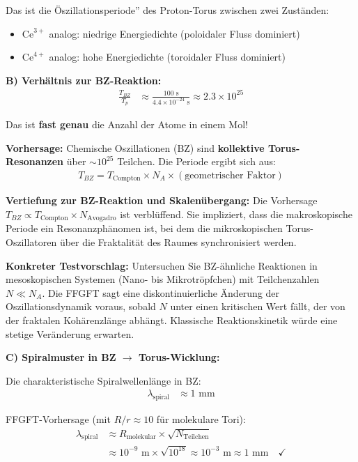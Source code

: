 	Das ist die Öszillationsperiode'' des Proton-Torus zwischen zwei Zuständen:
	\begin{itemize}
		\item $\text{Ce}^{3+}$ analog: niedrige Energiedichte (poloidaler Fluss dominiert)
		\item $\text{Ce}^{4+}$ analog: hohe Energiedichte (toroidaler Fluss dominiert)
	\end{itemize}
	
	\textbf{B) Verhältnis zur BZ-Reaktion:}
	\begin{align*}
		\frac{T_{BZ}}{T_p} &\approx \frac{100 \text{ s}}{4.4 \times 10^{-24} \text{ s}} \approx 2.3 \times 10^{25}
	\end{align*}
	
	Das ist \textbf{fast genau} die Anzahl der Atome in einem Mol!
	
	\textbf{Vorhersage:} Chemische Oszillationen (BZ) sind \textbf{kollektive Torus-Resonanzen} über $\sim 10^{25}$ Teilchen. Die Periode ergibt sich aus:
	\begin{align*}
		T_{BZ} = T_{\text{Compton}} \times N_A \times (\text{geometrischer Faktor})
	\end{align*}
	
	\textbf{Vertiefung zur BZ-Reaktion und Skalenübergang:}
	Die Vorhersage $T_{BZ} \propto T_{\text{Compton}} \times N_{\text{Avogadro}}$ ist verblüffend. Sie impliziert, dass die makroskopische Periode ein Resonanzphänomen ist, bei dem die mikroskopischen Torus-Oszillatoren über die Fraktalität des Raumes synchronisiert werden.
	
	\textbf{Konkreter Testvorschlag:} Untersuchen Sie BZ-ähnliche Reaktionen in mesoskopischen Systemen (Nano- bis Mikrotröpfchen) mit Teilchenzahlen $N \ll N_A$. Die FFGFT sagt eine diskontinuierliche Änderung der Oszillationsdynamik voraus, sobald $N$ unter einen kritischen Wert fällt, der von der fraktalen Kohärenzlänge abhängt. Klassische Reaktionskinetik würde eine stetige Veränderung erwarten.
	
	\textbf{C) Spiralmuster in BZ $\rightarrow$ Torus-Wicklung:}
	
	Die charakteristische Spiralwellenlänge in BZ:
	\begin{align*}
		\lambda_{\text{spiral}} &\approx 1 \text{ mm}
	\end{align*}
	
	FFGFT-Vorhersage (mit $R/r \approx 10$ für molekulare Tori):
	\begin{align*}
		\lambda_{\text{spiral}} &\approx R_{\text{molekular}} \times \sqrt{N_{\text{Teilchen}}} \\
		&\approx 10^{-9} \text{ m} \times \sqrt{10^{18}} \approx 10^{-3} \text{ m} \approx 1 \text{ mm} \quad \checkmark
	\end{align*}
	

